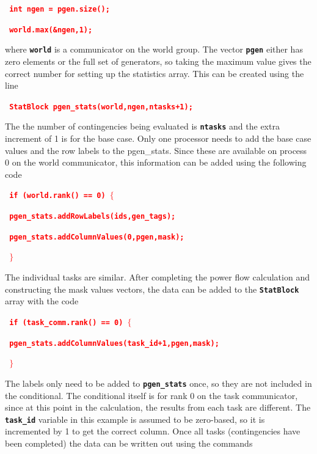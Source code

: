 \documentclass[12pt]{report} %
\begin{document}
\textcolor{red}{\texttt{\textbf{    int ngen = pgen.size();}}}

\textcolor{red}{\texttt{\textbf{    world.max(\&ngen,1);}}}

where \texttt{\textbf{world}} is a communicator on the world group. The vector \texttt{\textbf{pgen}} either has zero elements or the full set of generators, so taking the maximum value gives the correct number for setting up the statistics array. This can be created using the line

\textcolor{red}{\texttt{\textbf{    StatBlock pgen\_stats(world,ngen,ntasks+1);}}}

The the number of contingencies being evaluated is \texttt{\textbf{ntasks}} and the extra increment of 1 is for the base case. Only one processor needs to add the base case values and the row labels to the pgen\_stats. Since these are available on process 0 on the world communicator, this information can be added using the following code

\textcolor{red}{\texttt{\textbf{    if (world.rank() == 0) $\boldsymbol{\mathrm{\{}}$}}}

\textcolor{red}{\texttt{\textbf{      pgen\_stats.addRowLabels(ids,gen\_tags);}}}

\textcolor{red}{\texttt{\textbf{      pgen\_stats.addColumnValues(0,pgen,mask);}}}

\textcolor{red}{\texttt{\textbf{    $\boldsymbol{\mathrm{\}}}$}}}

The individual tasks are similar. After completing the power flow calculation and constructing the mask values vectors, the data can be added to the \texttt{\textbf{StatBlock}} array with the code

\textcolor{red}{\texttt{\textbf{     if (task\_comm.rank() == 0) $\boldsymbol{\mathrm{\{}}$}}}

\textcolor{red}{\texttt{\textbf{      pgen\_stats.addColumnValues(task\_id+1,pgen,mask);}}}

\textcolor{red}{\texttt{\textbf{     $\boldsymbol{\mathrm{\}}}$}}}

The labels only need to be added to \texttt{\textbf{pgen\_stats}} once, so they are not included in the conditional. The conditional itself is for rank 0 on the task communicator, since at this point in the calculation, the results from each task are different. The \texttt{\textbf{task\_id}} variable in this example is assumed to be zero-based, so it is incremented by 1 to get the correct column.
Once all tasks (contingencies have been completed) the data can be written out using the commands
\end{document}
